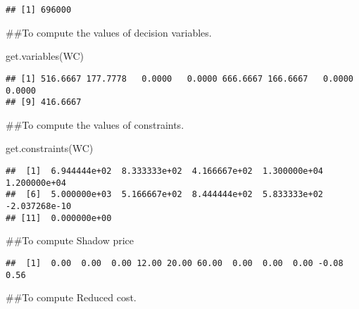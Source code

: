 \documentclass[
]{article}
\newenvironment{Shaded}{\begin{snugshade}}{\end{snugshade}}
\newcommand{\DecValTok}[1]{\textcolor[rgb]{0.00,0.00,0.81}{#1}}
\newcommand{\FunctionTok}[1]{\textcolor[rgb]{0.00,0.00,0.00}{#1}}
\newcommand{\NormalTok}[1]{#1}
\newcommand{\SpecialCharTok}[1]{\textcolor[rgb]{0.00,0.00,0.00}{#1}}
\begin{document}
\begin{verbatim}
## [1] 696000
\end{verbatim}

\#\#To compute the values of decision variables.

\begin{Shaded}
\begin{Highlighting}[]
\FunctionTok{get.variables}\NormalTok{(WC)}
\end{Highlighting}
\end{Shaded}

\begin{verbatim}
## [1] 516.6667 177.7778   0.0000   0.0000 666.6667 166.6667   0.0000   0.0000
## [9] 416.6667
\end{verbatim}

\#\#To compute the values of constraints.

\begin{Shaded}
\begin{Highlighting}[]
\FunctionTok{get.constraints}\NormalTok{(WC)}
\end{Highlighting}
\end{Shaded}

\begin{verbatim}
##  [1]  6.944444e+02  8.333333e+02  4.166667e+02  1.300000e+04  1.200000e+04
##  [6]  5.000000e+03  5.166667e+02  8.444444e+02  5.833333e+02 -2.037268e-10
## [11]  0.000000e+00
\end{verbatim}

\#\#To compute Shadow price

\begin{Shaded}
\end{Shaded}

\begin{verbatim}
##  [1]  0.00  0.00  0.00 12.00 20.00 60.00  0.00  0.00  0.00 -0.08  0.56
\end{verbatim}

\#\#To compute Reduced cost.

\begin{Shaded}
\end{Shaded}
\end{document}
